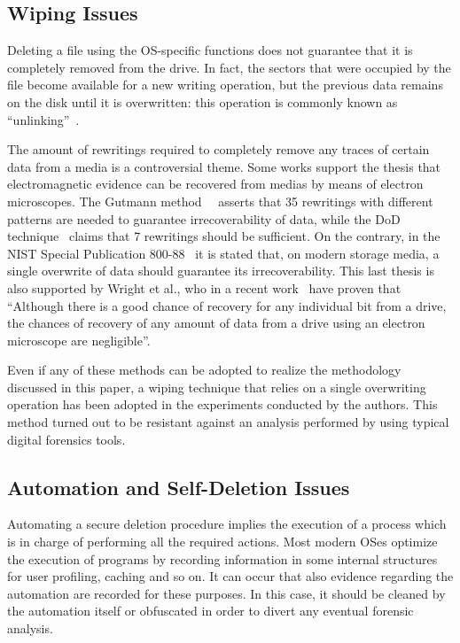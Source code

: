 \documentclass[10pt, conference, compsocconf]{IEEEtran}
\begin{document}
\subsection{Wiping Issues}
\label{wip1}
Deleting a file using the OS-specific functions does not guarantee that it is completely removed from the drive. In fact, the sectors that were occupied by the file become available for a new writing operation, but the previous data remains on the disk until it is overwritten: this operation is commonly known as ``unlinking''~\cite{os}.

The amount of rewritings required to completely remove any traces of certain data from a media is a controversial theme.
Some works support the thesis that electromagnetic evidence can be recovered from medias by means of electron microscopes. The Gutmann method~\cite{pgut01}~\cite{pgut02} asserts that 35 rewritings with different patterns are needed to guarantee irrecoverability of data, while the DoD technique~\cite{usdod5220} claims that 7 rewritings should be sufficient. On the contrary, in the NIST Special Publication 800-88~\cite{nist} it is stated that, on modern storage media, a single overwrite of data should guarantee its irrecoverability. This last thesis is also supported by Wright et al., who in a recent work~\cite{controversy} have proven that ``Although there is a good chance of recovery for any individual bit from a drive, the chances of recovery of any amount of data from a drive using an electron microscope are negligible''.

Even if any of these methods can be adopted to realize the methodology discussed in this paper, a wiping technique that relies on a single overwriting operation has been adopted in the experiments conducted by the authors. This method turned out to be resistant against an analysis performed by using typical digital forensics tools.


\subsection{Automation and Self-Deletion Issues}
\label{com_int}
Automating a secure deletion procedure implies the execution of a process which is in charge of performing all the required actions. Most modern OSes optimize the execution of programs by recording information in some internal structures for user profiling, caching and so on. It can occur that also evidence regarding the automation are recorded for these purposes.
In this case, it should be cleaned by the automation itself or obfuscated in order to divert any eventual forensic analysis.
\end{document}
